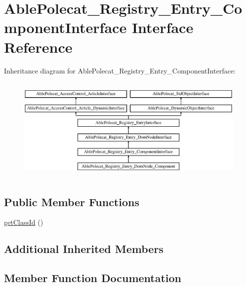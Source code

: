 \hypertarget{interface_able_polecat___registry___entry___component_interface}{}\section{Able\+Polecat\+\_\+\+Registry\+\_\+\+Entry\+\_\+\+Component\+Interface Interface Reference}
\label{interface_able_polecat___registry___entry___component_interface}
Inheritance diagram for Able\+Polecat\+\_\+\+Registry\+\_\+\+Entry\+\_\+\+Component\+Interface\+:\begin{figure}[H]
\begin{center}
\leavevmode
\includegraphics[height=5.121951cm]{interface_able_polecat___registry___entry___component_interface}
\end{center}
\end{figure}
\subsection*{Public Member Functions}
\begin{DoxyCompactItemize}
\item 
\hyperlink{interface_able_polecat___registry___entry___component_interface_acc9039051a8b6d4fe7c5ddfbaedbcbcb}{get\+Class\+Id} ()
\end{DoxyCompactItemize}
\subsection*{Additional Inherited Members}


\subsection{Member Function Documentation}
\hypertarget{interface_able_polecat___registry___entry___component_interface_acc9039051a8b6d4fe7c5ddfbaedbcbcb}{}
